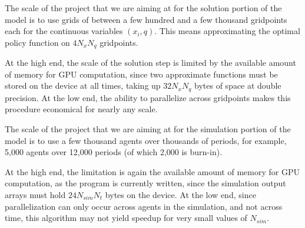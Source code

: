 \documentclass[a4paper,12pt]{article}
\numberwithin{equation}{section}
\theoremstyle{definition}
\begin{document}

The scale of the project that we are aiming at for the solution
portion of the model is to use grids of between a few hundred and a
few thousand gridpoints each for the continuous variables $(x_i,
q)$. This means approximating the optimal policy function on $4 N_x
N_q$ gridpoints.

At the high end, the scale of the solution step is limited by the
available amount of memory for GPU computation, since two approximate
functions must be stored on the device at all times, taking up $32 N_x
N_q$ bytes of space at double precision. At the low end, the ability
to parallelize across gridpoints makes this procedure economical for
nearly any scale.

The scale of the project that we are aiming at for the simulation
portion of the model is to use a few thousand agents over thousands of
periods, for example, 5,000 agents over 12,000 periods (of which 2,000
is burn-in).

At the high end, the limitation is again the available amount of
memory for GPU computation, as the program is currently written, since
the simulation output arrays must hold $24 N_{sim} N_t$ bytes on the
device. At the low end, since parallelization can only occur across
agents in the simulation, and not across time, this algorithm may not
yield speedup for very small values of $N_{sim}$.

% 
\end{document}
